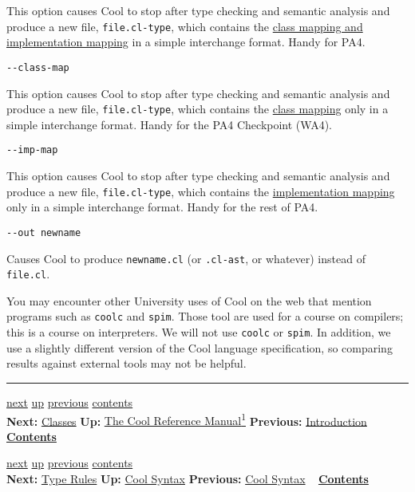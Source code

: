 \documentclass[]{article}
\begin{document}
This option causes Cool to stop after type checking and semantic
analysis and produce a new file, \texttt{file.cl-type}, which contains
the \href{node47.html}{class mapping and implementation mapping} in a
simple interchange format. Handy for PA4.

\texttt{-{}-class-map}

This option causes Cool to stop after type checking and semantic
analysis and produce a new file, \texttt{file.cl-type}, which contains
the \href{node47.html}{class mapping} only in a simple interchange
format. Handy for the PA4 Checkpoint (WA4).

\texttt{-{}-imp-map}

This option causes Cool to stop after type checking and semantic
analysis and produce a new file, \texttt{file.cl-type}, which contains
the \href{node47.html}{implementation mapping} only in a simple
interchange format. Handy for the rest of PA4.

\texttt{-{}-out newname}

Causes Cool to produce \texttt{newname.cl} (or \texttt{.cl-ast}, or
whatever) instead of \texttt{file.cl}.

You may encounter other University uses of Cool on the web that mention
programs such as \texttt{coolc} and \texttt{spim}. Those tool are used
for a course on compilers; this is a course on interpreters. We will not
use \texttt{coolc} or \texttt{spim}. In addition, we use a slightly
different version of the Cool language specification, so comparing
results against external tools may not be helpful.

\begin{center}\rule{3in}{0.4pt}\end{center}

\href{node4.html}{next} \href{cool-manual.html}{up}
\href{node2.html}{previous} \href{node1.html}{contents} \\
\textbf{Next:} \href{node4.html}{Classes} \textbf{Up:}
\href{cool-manual.html}{The Cool Reference Manual\textsuperscript{1}}
\textbf{Previous:} \href{node2.html}{Introduction} ~
\textbf{\href{node1.html}{Contents}}

\href{node41.html}{next} \href{node39.html}{up}
\href{node39.html}{previous} \href{node1.html}{contents} \\
\textbf{Next:} \href{node41.html}{Type Rules} \textbf{Up:}
\href{node39.html}{Cool Syntax} \textbf{Previous:}
\href{node39.html}{Cool Syntax} ~ \textbf{\href{node1.html}{Contents}}
\\ \\
\end{document}
